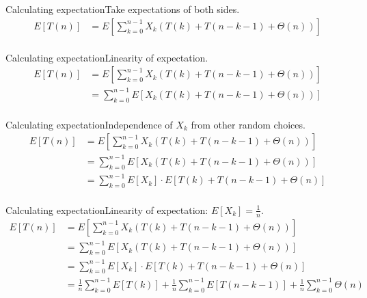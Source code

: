\documentclass{beamer}
\begin{document}
\begin{frame}{Calculating expectation}{Take expectations of both sides.}
    \begin{equation*}
        \begin{split}
E[T(n)] &= E\left[ \sum\limits_{k=0}^{n-1} X_k(T(k) + T(n - k - 1) + \Theta(n)) \right] \\
        \end{split}
    \end{equation*}
\end{frame}

\begin{frame}{Calculating expectation}{Linearity of expectation.}
    \begin{equation*}
        \begin{split}
E[T(n)] &= E\left[ \sum\limits_{k=0}^{n-1} X_k(T(k) + T(n - k - 1) + \Theta(n)) \right] \\
        &= \sum\limits_{k=0}^{n-1} E\left[ X_k(T(k) + T(n - k - 1) + \Theta(n)) \right] \\
        \end{split}
    \end{equation*}
\end{frame}

\begin{frame}{Calculating expectation}{Independence of $X_k$ from other random choices.}
    \begin{equation*}
        \begin{split}
E[T(n)] &= E\left[ \sum\limits_{k=0}^{n-1} X_k(T(k) + T(n - k - 1) + \Theta(n)) \right] \\
        &= \sum\limits_{k=0}^{n-1} E\left[ X_k(T(k) + T(n - k - 1) + \Theta(n)) \right] \\
        &= \sum\limits_{k=0}^{n-1} E[X_k] \cdot E[T(k) + T(n - k - 1) + \Theta(n)] \\
        \end{split}
    \end{equation*}
\end{frame}

\begin{frame}{Calculating expectation}{Linearity of expectation: $E[X_k] = \frac{1}{n}$.}
    \begin{equation*}
        \begin{split}
E[T(n)] &= E\left[ \sum\limits_{k=0}^{n-1} X_k(T(k) + T(n - k - 1) + \Theta(n)) \right] \\
        &= \sum\limits_{k=0}^{n-1} E\left[ X_k(T(k) + T(n - k - 1) + \Theta(n)) \right] \\
        &= \sum\limits_{k=0}^{n-1} E[X_k] \cdot E[T(k) + T(n - k - 1) + \Theta(n)] \\
        &= \frac{1}{n}\sum\limits_{k=0}^{n-1} E[T(k)] +
           \frac{1}{n}\sum\limits_{k=0}^{n-1} E[T(n - k - 1)] +
           \frac{1}{n}\sum\limits_{k=0}^{n-1} \Theta(n) \\
        \end{split}
    \end{equation*}
\end{frame}
\end{document}
